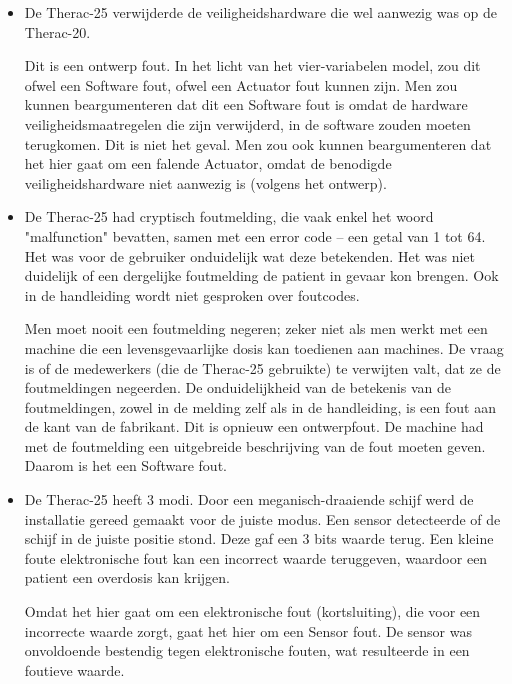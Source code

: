 \documentclass{article}
\begin{document}
				\begin{itemize}
					\item De Therac-25 verwijderde de veiligheidshardware die wel aanwezig was op de Therac-20. \par
						
						Dit is een ontwerp fout. In het licht van het vier-variabelen model, zou dit ofwel een Software fout, ofwel een Actuator fout kunnen zijn. Men zou kunnen beargumenteren dat dit een Software fout is omdat de hardware veiligheidsmaatregelen die zijn verwijderd, in de software zouden moeten terugkomen. Dit is niet het geval. Men zou ook kunnen beargumenteren dat het hier gaat om een falende Actuator, omdat de benodigde veiligheidshardware niet aanwezig is (volgens het ontwerp). \par

					\item De Therac-25 had cryptisch foutmelding, die vaak enkel het woord "malfunction" bevatten, samen met een error code -- een getal van 1 tot 64. Het was voor de gebruiker onduidelijk wat deze betekenden. Het was niet duidelijk of een dergelijke foutmelding de patient in gevaar kon brengen. Ook in de handleiding wordt niet gesproken over foutcodes. \par

						Men moet nooit een foutmelding negeren; zeker niet als men werkt met een machine die een levensgevaarlijke dosis kan toedienen aan machines. De vraag is of de medewerkers (die de Therac-25 gebruikte) te verwijten valt, dat ze de foutmeldingen negeerden. De onduidelijkheid van de betekenis van de foutmeldingen, zowel in de melding zelf als in de handleiding, is een fout aan de kant van de fabrikant. Dit is opnieuw een ontwerpfout. De machine had met de foutmelding een uitgebreide beschrijving van de fout moeten geven. Daarom is het een Software fout. \par

					\item De Therac-25 heeft 3 modi. Door een meganisch-draaiende schijf werd de installatie gereed gemaakt voor de juiste modus. Een sensor detecteerde of de schijf in de juiste positie stond. Deze gaf een 3 bits waarde terug. Een kleine foute elektronische fout kan een incorrect waarde teruggeven, waardoor een patient een overdosis kan krijgen. \par

						Omdat het hier gaat om een elektronische fout (kortsluiting), die voor een incorrecte waarde zorgt, gaat het hier om een Sensor fout. De sensor was onvoldoende bestendig tegen elektronische fouten, wat resulteerde in een foutieve waarde. \par


\end{itemize}
\end{document}
